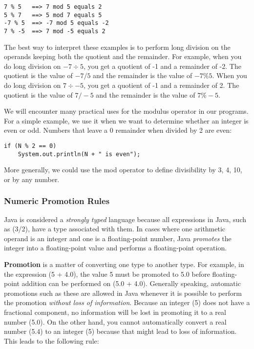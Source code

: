 \begin{jjjlisting}
\begin{lstlisting}
7 % 5   ==> 7 mod 5 equals 2
5 % 7   ==> 5 mod 7 equals 5
-7 % 5  ==> -7 mod 5 equals -2
7 % -5  ==> 7 mod -5 equals 2
\end{lstlisting}
\end{jjjlisting}

\noindent The best way to interpret these examples is to perform
long division on the operands keeping both the quotient and the
remainder.  For example, when you do long division on $-7 \div 5$, you
get a quotient of -1 and a remainder of -2. The quotient is the value
of $-7/5$ and the remainder is the value of $-7 \% 5$.  When you
do long division on $7 \div -5$, you get a quotient of -1 and a
remainder of 2. The quotient is the value of $7/-5$ and the
remainder is the value of $7\%-5$.  

We will encounter many practical uses for the modulus operator in our
programs. For a simple example, we use it when we want to determine
whether an integer is even or odd. Numbers that leave a 0 remainder
when divided by 2 are even:

\begin{jjjlisting}
\begin{lstlisting}
if (N % 2 == 0)
    System.out.println(N + " is even");
\end{lstlisting}
\end{jjjlisting}

\noindent More generally, we could use the mod operator to define
divisibility by 3, 4, 10, or by any number.

\subsubsection*{Numeric Promotion Rules}

\noindent Java is considered a {\it strongly typed} language because all expressions 
in Java, such as
(3/2), have a type associated with them.  In cases where one
arithmetic operand is an integer and one is a floating-point number,
Java {\it promotes} the integer into a floating-point value and
performs a floating-point operation.

{\bf Promotion} is a matter of converting one type to another type.
For example, in the expression (5 + 4.0), the value 5 must be promoted
to 5.0 before floating-point addition can be performed on (5.0 + 4.0).
Generally speaking, automatic promotions such as these are allowed in
Java whenever it is possible to perform the promotion {\it without
loss of information}.  Because an integer (5) does not have a
fractional component, no information will be lost in promoting it to a
real number (5.0).  On the other hand, you cannot automatically
convert a real number (5.4) to an integer (5) because that might lead
to loss of information.  This leads to the following rule:

